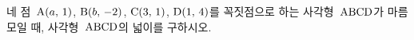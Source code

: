 네 점~$\mathrm{A}(a,\,1)$, $\mathrm{B}(b,\,-2)$, $\mathrm{C}(3,\,1)$, $\mathrm{D}(1,\,4)$를 꼭짓점으로 하는 사각형~$\mathrm{ABCD}$가 마름모일 때, 사각형~$\mathrm{ABCD}$의 넓이를 구하시오. 
